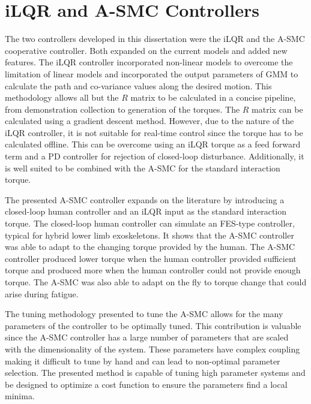 \section{iLQR and A-SMC Controllers}

The two controllers developed in this dissertation were the iLQR and the A-SMC cooperative controller. Both expanded on the current models and added new features. The iLQR controller incorporated non-linear models to overcome the limitation of linear models and incorporated the output parameters of GMM to calculate the path and co-variance values along the desired motion. This methodology allows all but the $R$ matrix to be calculated in a concise pipeline, from demonstration collection to generation of the torques. The $R$ matrix can be calculated using a gradient descent method. However, due to the nature of the iLQR controller, it is not suitable for real-time control since the torque has to be calculated offline. This can be overcome using an iLQR torque as a feed forward term and a PD controller for rejection of closed-loop disturbance. Additionally, it is well suited to be combined with the A-SMC for the standard interaction torque. 

The presented A-SMC controller expands on the literature by introducing a closed-loop human controller and an iLQR input as the standard interaction torque. The closed-loop human controller can simulate an FES-type controller, typical for hybrid lower limb exoskeletons. It shows that the A-SMC controller was able to adapt to the changing torque provided by the human. The A-SMC controller produced lower torque when the human controller provided sufficient torque and produced more when the human controller could not provide enough torque. The A-SMC was also able to adapt on the fly to torque change that could arise during fatigue. 

The tuning methodology presented to tune the A-SMC allows for the many parameters of the controller to be optimally tuned. This contribution is valuable since the A-SMC controller has a large number of parameters that are scaled with the dimensionality of the system. These parameters have complex coupling making it difficult to tune by hand and can lead to non-optimal parameter selection. The presented method is capable of tuning high parameter systems and be designed to optimize a cost function to ensure the parameters find a local minima. 

